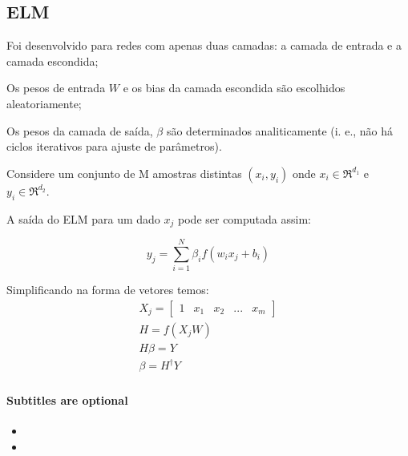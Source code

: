 \documentclass{beamer}
\begin{document}
\subsection{ELM}

\begin{frame}
Foi desenvolvido para redes com apenas
duas camadas: a camada de entrada e a
camada escondida;

Os pesos de entrada $W$ e os bias da camada
escondida são escolhidos aleatoriamente;

Os pesos da camada de saída, $\beta$ são
determinados analiticamente (i. e., não há
ciclos iterativos para ajuste de parâmetros).


\end{frame}

\begin{frame}
	Considere um conjunto de M amostras distintas $(x_i,y_i)$ onde $x_i \in
	\Re^{d_1}$ e $y_i \in \Re^{d_2}$.
	
	A saída do ELM para um dado $x_j$ pode ser computada assim:
	
	\begin{equation}
	y_j= \sum_{i=1}^{N} \beta_i f(w_i x_j + b_i)
	\end{equation}
	
	Simplificando na forma de vetores temos:
	\begin{align}
		X_j = \begin{bmatrix}
					 1 & x_1 & x_2 & ...& x_m
			  \end{bmatrix} \\
		H = f(X_j W)\\
		H \beta  = Y \\
		\beta = H^{\dagger} Y
	\end{align}
\end{frame}


\begin{frame}
	\frametitle{}
	\framesubtitle{Subtitles are optional}
	
	\begin{itemize}
	  \item
	  \item
	\end{itemize}
\end{frame}
\end{document}
